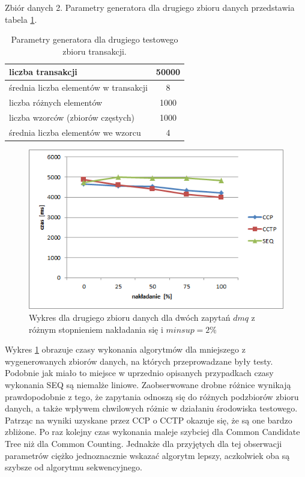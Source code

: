 Zbiór danych 2. Parametry generatora dla drugiego zbioru danych przedstawia tabela \ref{table:secondDataSetParams}. 
\begin{table}[h]
	\begin{center}
		\begin{tabular}{| l | c |}
			\hline
			liczba transakcji & 50000 \\ \hline
			średnia liczba elementów w transakcji & 8 \\ \hline
			liczba różnych elementów & 1000 \\ \hline
			liczba wzorców (zbiorów częstych) & 1000 \\ \hline
			średnia liczba elementów we wzorcu & 4 \\ 
			\hline
		\end{tabular}
	\end{center}
	\caption{Parametry generatora dla drugiego testowego zbioru transakcji.}
	\label{table:secondDataSetParams}
\end{table}

\begin{figure}[h]
	\centering
	\includegraphics[width=0.8\linewidth]{figures/chart_50_2}
	\caption{Wykres dla drugiego zbioru danych dla dwóch zapytań \(dmq\) z różnym stopnieniem nakładania się i \(minsup = 2\%\)}
	\label{fig:chart_50_2}
\end{figure}
Wykres \ref{fig:chart_50_2} obrazuje czasy wykonania algorytmów dla mniejszego z wygenerowanych zbiorów danych, na których przeprowadzane były testy. Podobnie jak miało to miejsce w uprzednio opisanych przypadkach czasy wykonania SEQ są niemalże liniowe. Zaobserwowane drobne różnice wynikają prawdopodobnie z tego, że zapytania odnoszą się do różnych podzbiorów zbioru danych, a także wpływem chwilowych różnic w działaniu środowiska testowego. Patrząc na wyniki uzyskane przez CCP o CCTP okazuje się, że są one bardzo zbliżone. Po raz kolejny czas wykonania maleje szybciej dla Common Candidate Tree niż dla Common Counting. Jednakże dla przyjętych dla tej obserwacji parametrów ciężko jednoznacznie wskazać algorytm lepszy, aczkolwiek oba są szybsze od algorytmu sekwencyjnego. 

